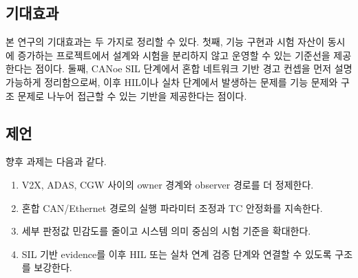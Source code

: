 \documentclass[11pt,a4paper]{article}
\begin{document}
\subsection{기대효과}

본 연구의 기대효과는 두 가지로 정리할 수 있다. 첫째, 기능 구현과 시험 자산이 동시에 증가하는 프로젝트에서 설계와 시험을 분리하지 않고 운영할 수 있는 기준선을 제공한다는 점이다. 둘째, CANoe SIL 단계에서 혼합 네트워크 기반 경고 컨셉을 먼저 설명 가능하게 정리함으로써, 이후 HIL이나 실차 단계에서 발생하는 문제를 기능 문제와 구조 문제로 나누어 접근할 수 있는 기반을 제공한다는 점이다.

\subsection{제언}

향후 과제는 다음과 같다.

\begin{enumerate}[label=\arabic*.]
\item V2X, ADAS, CGW 사이의 owner 경계와 observer 경로를 더 정제한다.
\item 혼합 CAN/Ethernet 경로의 실행 파라미터 조정과 TC 안정화를 지속한다.
\item 세부 판정값 민감도를 줄이고 시스템 의미 중심의 시험 기준을 확대한다.
\item SIL 기반 evidence를 이후 HIL 또는 실차 연계 검증 단계와 연결할 수 있도록 구조를 보강한다.
\end{enumerate}
\end{document}
